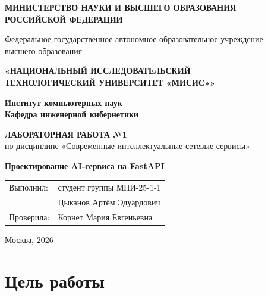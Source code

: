 \documentclass[12pt,a4paper]{article}
\begin{document}
\begin{titlepage}
  \begin{center}
    \textbf{МИНИСТЕРСТВО НАУКИ И ВЫСШЕГО ОБРАЗОВАНИЯ\\
    РОССИЙСКОЙ ФЕДЕРАЦИИ}

    \vspace{0.5cm}

    Федеральное государственное автономное образовательное учреждение\\
    высшего образования

    \vspace{0.3cm}

    \textbf{«НАЦИОНАЛЬНЫЙ ИССЛЕДОВАТЕЛЬСКИЙ\\
    ТЕХНОЛОГИЧЕСКИЙ УНИВЕРСИТЕТ «МИСИС»»}

    \vspace{1.5cm}

    \textbf{Институт компьютерных наук}\\[0.3cm]
    \textbf{Кафедра инженерной кибернетики}

    \vspace{1.7cm}

    \textbf{ЛАБОРАТОРНАЯ РАБОТА №1}\\[0.4cm]
    по дисциплине «Современные интеллектуальные сетевые сервисы»

    \vspace{1.5cm}

    {\Large\bfseries Проектирование AI-сервиса на FastAPI}
  \end{center}

  \vfill

  \begin{flushright}
    \begin{tabular}{@{}ll@{}}
      Выполнил: & студент группы МПИ-25-1-1 \\
                & Цыканов Артём Эдуардович \\[0.5cm]
      Проверила: & Корнет Мария Евгеньевна \\
    \end{tabular}
  \end{flushright}

  \vfill

  \begin{center}
    Москва, 2026
  \end{center}
\end{titlepage}

\tableofcontents
\newpage

\section{Цель работы}
\end{document}
